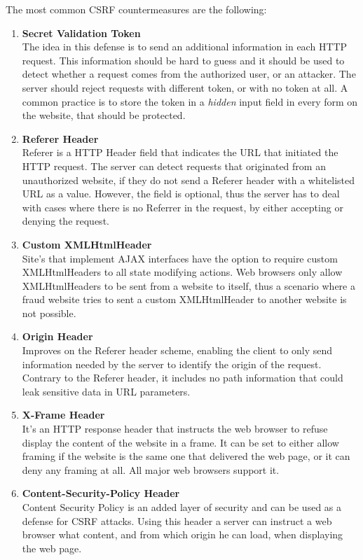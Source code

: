 The most common CSRF countermeasures are the following:
\begin{enumerate}
	\item \textbf{Secret Validation Token} \\
The idea in this defense is to send an additional information in each HTTP request. This information should be hard
to guess and it should be used to detect whether a request comes from the authorized user, or an attacker.  The server
should reject requests with different token, or with no token at all.  A common practice is to store the token in a 
\emph{hidden} input field in every form on the website, that should be protected.
	\item \textbf{Referer Header} \\
Referer is a HTTP Header field that indicates the URL that initiated the HTTP request. The server can detect requests
that originated from an unauthorized website, if they do not send a Referer header with a whitelisted URL as a value. 
However, the field is optional, thus the server has to deal with cases where there is no Referrer in the request, 
by either accepting or denying the request.
	\item \textbf{Custom  XMLHtmlHeader} \\
	Site's that implement AJAX interfaces have the option to require custom XMLHtmlHeaders to all state modifying actions.
Web browsers only allow XMLHtmlHeaders to be sent from a website to itself, thus a scenario where a fraud website tries
to sent a custom XMLHtmlHeader to another website is not possible.
	\item \textbf{Origin Header} \\
	Improves on the Referer header scheme, enabling the client to only send information needed by the server to
	identify the origin of the request. Contrary to the Referer header, it includes no path information that could 
	leak sensitive data in URL parameters.
	\item \textbf{X-Frame Header} \\
	It's an HTTP response header that instructs the web browser to refuse display the content of 
	the website in a frame.  It can be set to either allow framing if the website is the same one that delivered 
	the web page, or it can deny any framing at all.  All major web browsers support it.
	\item \textbf{Content-Security-Policy Header} \\
	Content Security Policy is an added layer of security and can be used as a defense for CSRF attacks.  Using 
	this header a server can instruct a web browser what content, and from which origin he can load, when displaying
	the web page.
\end{enumerate}
\begin{comment}
Access-Control-Allow-Origin 
Many websites today need to access resources on different domain than theirs.  In this scenario the web browser
is forced to make a request to the server hosting the resource.  The server may pose a restriction on the 
domains that can access his content, by requiring the web browser to include an Origin header to check on the
domain demanding the resource.
\end{comment}


